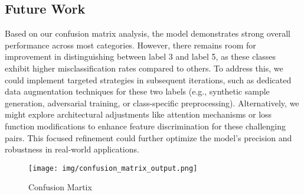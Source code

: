 \documentclass[a4paper,11pt]{article}
\begin{document}
\subsection{Future Work}
Based on our confusion matrix analysis, the model demonstrates strong overall performance across most categories. However, there remains room for improvement in distinguishing between label 3 and label 5, as these classes exhibit higher misclassification rates compared to others. To address this, we could implement targeted strategies in subsequent iterations, such as dedicated data augmentation techniques for these two labels (e.g., synthetic sample generation, adversarial training, or class-specific preprocessing). Alternatively, we might explore architectural adjustments like attention mechanisms or loss function modifications to enhance feature discrimination for these challenging pairs. This focused refinement could further optimize the model's precision and robustness in real-world applications.
\begin{figure}
    \centering
    \texttt{[image: img/confusion\_matrix\_output.png]}
    \caption{Confusion Martix}
    \label{fig:enter-label}
\end{figure}
\end{document}
